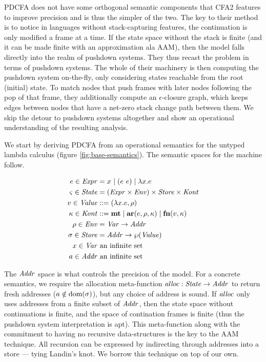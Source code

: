 \documentclass{llncs}
\begin{document}
PDCFA does not have some orthogonal semantic components that CFA2
features to improve precision and is thus the simpler of the two. The
key to their method is to notice in languages without stack-capturing
features, the continuation is only modified a frame at a time. If the
state space without the stack is finite (and it can be made finite
with an approximation ala AAM), then the model falls directly into the
realm of pushdown systems. They thus recast the problem in terms of
pushdown systems. The whole of their machinery is then computing the
pushdown system on-the-fly, only considering states reachable from the
root (initial) state. To match nodes that push frames with later nodes
following the pop of that frame, they additionally compute an
$\epsilon$-closure graph, which keeps edges between nodes that have a
net-zero stack change path between them. We skip the detour to
pushdown systems altogether and show an operational understanding of
the resulting analysis.

We start by deriving PDCFA from an operational semantics for the
untyped lambda calculus (figure \ref{fig:base-semantics}). The
semantic spaces for the machine follow.

\begin{align*}
  e \in \mathit{Expr} &= x^{{}} \mid (e\ e){} \mid \lambda{} x. e \\
  \varsigma \in \mathit{State} &= (\mathit{Expr} \times \mathit{Env}) \times \mathit{Store} \times \mathit{Kont} \\
  v \in \mathit{Value} &::= (\lambda{} x. e, \rho) \\
  \kappa \in \mathit{Kont} &::= \mathbf{mt} \mid \mathbf{ar}{}(e,\rho,\kappa) \mid \mathbf{fn}{}(v,\kappa) \\
  \rho \in \mathit{Env} &= \mathit{Var} \to \mathit{Addr} \\
  \sigma \in \mathit{Store} &= \mathit{Addr} \to \wp(\mathit{Value}) \\
  x \in \mathit{Var} &\text{ an infinite set} \\
  a \in \mathit{Addr} &\text{ an infinite set}
\end{align*}

The $\mathit{Addr}$ space is what controls the precision of the model. For a
concrete semantics, we require the allocation meta-function $\mathit{alloc} :
\mathit{State} \to \mathit{Addr}$ to return fresh addresses ($a \notin
\text{dom}(\sigma)$), but any choice of address is sound. If $\mathit{alloc}$ only
uses addresses from a finite subset of $\mathit{Addr}$, then the state space
without continuations is finite, and the space of contination frames
is finite (thus the pushdown system interpretation is apt). This
meta-function along with the commitment to having no recursive
data-structures is the key to the AAM technique. All recursion can be
expressed by indirecting through addresses into a store --- tying
Landin's knot. We borrow this technique on top of our own.
\end{document}
